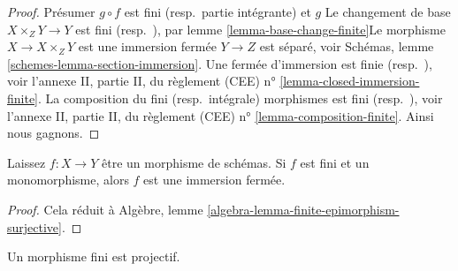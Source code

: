 \begin{proof}

Présumer $g \circ f$ est fini (resp.\ partie intégrante) et $g$ Le changement de base $X \times_Z Y \to Y$ est fini (resp.\ ), par lemme \ref{lemma-base-change-finite}Le morphisme $X \to X \times_Z Y$ est une immersion fermée $Y \to Z$ est séparé, voir Schémas, lemme \ref{schemes-lemma-section-immersion}. Une fermée d'immersion est finie (resp.\ ), voir l'annexe II, partie II, du règlement (CEE) n° \ref{lemma-closed-immersion-finite}. La composition du fini (resp.\ intégrale) morphismes est fini (resp.\ ), voir l'annexe II, partie II, du règlement (CEE) n° \ref{lemma-composition-finite}. Ainsi nous gagnons.

\end{proof}

\begin{lemma}

\label{lemma-finite-monomorphism-closed}
Laissez $f : X \to Y$ être un morphisme de schémas. Si $f$ est fini et un monomorphisme, alors $f$ est une immersion fermée.
\end{lemma}

\begin{proof}
Cela réduit à Algèbre, lemme \ref{algebra-lemma-finite-epimorphism-surjective}.
\end{proof}

\begin{lemma}

\label{lemma-finite-projective}

Un morphisme fini est projectif.

\end{lemma}

